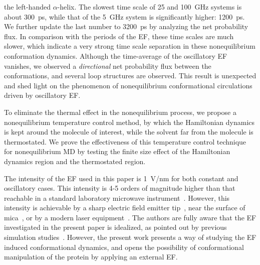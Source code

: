 \documentclass[a4paper,preprint,unsortedaddress,onecolumn]{revtex4-1}
\begin{document}
the left-handed $\alpha$-helix.
The slowest time scale of 25 and 100~GHz systems is about 300~ps, while
that of the 5~GHz system is significantly higher: 1200~ps.
We further update the last number to 3200~ps by analyzing the net probability flux.
In comparison with the periods of the EF, these time scales are much
slower, which indicate a very strong time scale separation
in these nonequilibrium conformation dynamics.
Although the time-average of the oscillatory EF vanishes, we observed a
\emph{directional} net probability flux between the conformations, and several
loop structures are observed. This result is unexpected and shed
light on the phenomenon of nonequilibrium conformational circulations driven
by oscillatory EF.

To eliminate the thermal effect in the nonequilibrium process, 
we propose  a nonequilibrium
temperature control method, by which the Hamiltonian dynamics is kept
around the molecule of interest, while the solvent far from the
molecule is thermostated. We prove the effectiveness of this
temperature control technique for nonequilibrium MD by testing
the finite size effect of the Hamiltonian dynamics region and the
thermostated region.

The intensity of the EF used in this paper is 1~V/nm for both constant
and oscillatory cases. This intensity is 4-5 orders of magnitude
higher than that reachable in a standard laboratory microwave
instrument~\cite{damm2012can}. However, this intensity is achievable
by a sharp electric field emitter tip~\cite{scovell2000phase}, near
the surface of mica~\cite{starzyk2013proteins}, or by a modern laser
equipment~\cite{vogel2008femtosecond}. The authors are fully aware
that the EF investigated in the present paper is idealized, as pointed
out by previous simulation studies~\cite{budi2005electric,
  budi2007effect, budi2008comparative, toschi2008effects,
  astrakas2011electric, astrakas2012structural, damm2012can,
  starzyk2013proteins, english2009nonequilibrium,
  solomentsev2012effects}. However, the present work presents a way of
studying the EF induced conformational dynamics, and opens the
possibility of conformational manipulation of the protein by applying
an external EF.
\end{document}
